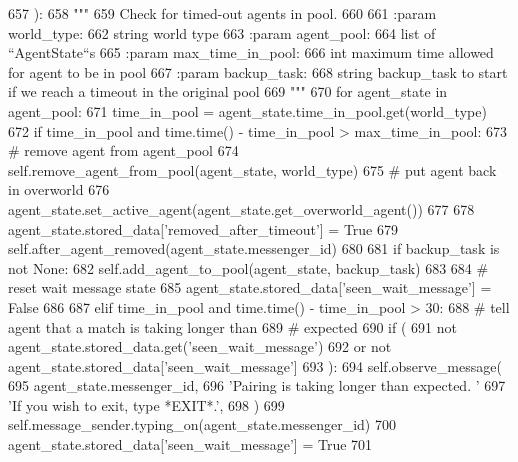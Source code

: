 \begin{DoxyCode}
657     ):
658         \textcolor{stringliteral}{"""}
659 \textcolor{stringliteral}{        Check for timed-out agents in pool.}
660 \textcolor{stringliteral}{}
661 \textcolor{stringliteral}{        :param world\_type:}
662 \textcolor{stringliteral}{            string world type}
663 \textcolor{stringliteral}{        :param agent\_pool:}
664 \textcolor{stringliteral}{            list of ``AgentState``s}
665 \textcolor{stringliteral}{        :param max\_time\_in\_pool:}
666 \textcolor{stringliteral}{            int maximum time allowed for agent to be in pool}
667 \textcolor{stringliteral}{        :param backup\_task:}
668 \textcolor{stringliteral}{            string backup\_task to start if we reach a timeout in the original pool}
669 \textcolor{stringliteral}{        """}
670         \textcolor{keywordflow}{for} agent\_state \textcolor{keywordflow}{in} agent\_pool:
671             time\_in\_pool = agent\_state.time\_in\_pool.get(world\_type)
672             \textcolor{keywordflow}{if} time\_in\_pool \textcolor{keywordflow}{and} time.time() - time\_in\_pool > max\_time\_in\_pool:
673                 \textcolor{comment}{# remove agent from agent\_pool}
674                 self.remove\_agent\_from\_pool(agent\_state, world\_type)
675                 \textcolor{comment}{# put agent back in overworld}
676                 agent\_state.set\_active\_agent(agent\_state.get\_overworld\_agent())
677 
678                 agent\_state.stored\_data[\textcolor{stringliteral}{'removed\_after\_timeout'}] = \textcolor{keyword}{True}
679                 self.after\_agent\_removed(agent\_state.messenger\_id)
680 
681                 \textcolor{keywordflow}{if} backup\_task \textcolor{keywordflow}{is} \textcolor{keywordflow}{not} \textcolor{keywordtype}{None}:
682                     self.add\_agent\_to\_pool(agent\_state, backup\_task)
683 
684                 \textcolor{comment}{# reset wait message state}
685                 agent\_state.stored\_data[\textcolor{stringliteral}{'seen\_wait\_message'}] = \textcolor{keyword}{False}
686 
687             \textcolor{keywordflow}{elif} time\_in\_pool \textcolor{keywordflow}{and} time.time() - time\_in\_pool > 30:
688                 \textcolor{comment}{# tell agent that a match is taking longer than}
689                 \textcolor{comment}{# expected}
690                 \textcolor{keywordflow}{if} (
691                     \textcolor{keywordflow}{not} agent\_state.stored\_data.get(\textcolor{stringliteral}{'seen\_wait\_message'})
692                     \textcolor{keywordflow}{or} \textcolor{keywordflow}{not} agent\_state.stored\_data[\textcolor{stringliteral}{'seen\_wait\_message'}]
693                 ):
694                     self.observe\_message(
695                         agent\_state.messenger\_id,
696                         \textcolor{stringliteral}{'Pairing is taking longer than expected. '}
697                         \textcolor{stringliteral}{'If you wish to exit, type *EXIT*.'},
698                     )
699                     self.message\_sender.typing\_on(agent\_state.messenger\_id)
700                     agent\_state.stored\_data[\textcolor{stringliteral}{'seen\_wait\_message'}] = \textcolor{keyword}{True}
701 
\end{DoxyCode}
